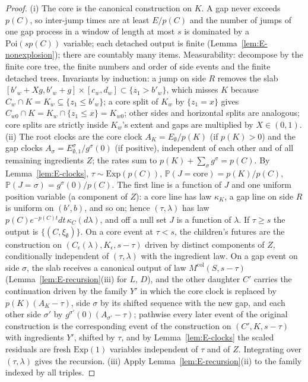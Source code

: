 \documentclass[11pt]{article}
\theoremstyle{plain}
\theoremstyle{definition}
\theoremstyle{remark}
\newcommand{\PP}{\mathbb{P}}
\newcommand{\Mcol}{M^{\mathrm{col}}}
\begin{document}
\begin{proof}
(i) The core is the canonical construction on $K$. A gap never exceeds $p(C)$, so
inter-jump times are at least $E/p(C)$ and the number of jumps of one gap process
in a window of length at most $s$ is dominated by a $\mathrm{Poi}(sp(C))$ variable; each
detached output is finite (Lemma~\ref{lem:E-nonexplosion}); there are countably many
items. Measurability: decompose by the finite core tree, the finite numbers and
order of side events and the finite detached trees. Invariants by induction: a
jump on side $R$ removes the slab $[b'_w+Xg,b'_w+g]\times[c_w,d_w]\subset\{z_1>b'_w\}$, which misses
$K$ because $C_w\cap K=K_w\subseteq\{z_1\le b'_w\}$; a core split of $K_w$ by $\{z_1=x\}$ gives
$C_{w0}\cap K=K_w\cap\{z_1\le x\}=K_{w0}$; other sides and horizontal splits are analogous; core
splits are strictly inside $K_w$'s extent and gaps are multiplied by $X\in(0,1)$.
(ii) The root clocks are the core clock $A_K=E_\emptyset/p(K)$ (if $p(K)>0$) and the gap
clocks $A_\sigma=E^{\sigma}_{\emptyset,1}/g^{\sigma}(0)$ (if positive), independent of each other and of
all remaining ingredients $Z$; the rates sum to $p(K)+\sum_\sigma g^{\sigma}=p(C)$. By
Lemma~\ref{lem:E-clocks}, $\tau\sim\mathrm{Exp}(p(C))$, $\PP(J=\mathrm{core})=p(K)/p(C)$, $\PP(J=\sigma)=g^{\sigma}(0)/p(C)$.
The first line is a function of $J$ and one uniform position variable (a component
of $Z$): a core line has law $\kappa_K$, a gap line on side $R$ is uniform on $(b',b)$, and so
on; hence $(\tau,\lambda)$ has law $p(C)e^{-p(C)t}dt\,\kappa_C(d\lambda)$, and off a null set $J$ is a
function of $\lambda$. If $\tau\ge s$ the output is $\{(C,\xi_\emptyset)\}$. On a core event at $\tau<s$, the
children's futures are the construction on $(C_\epsilon(\lambda),K_\epsilon,s-\tau)$ driven by distinct
components of $Z$, conditionally independent of $(\tau,\lambda)$ with the ingredient law. On
a gap event on side $\sigma$, the slab receives a canonical output of law
$\Mcol(S,s-\tau)$ (Lemma~\ref{lem:E-recursion}(iii) for $L$, $D$), and the other daughter
$C'$ carries the continuation driven by the family $Y'$ in which the core clock is
replaced by $p(K)(A_K-\tau)$, side $\sigma$ by its shifted sequence with the new gap, and
each other side $\sigma'$ by $g^{\sigma'}(0)(A_{\sigma'}-\tau)$; pathwise every later event of the original
construction is the corresponding event of the construction on $(C',K,s-\tau)$ with
ingredients $Y'$, shifted by $\tau$, and by Lemma~\ref{lem:E-clocks} the scaled residuals are
fresh $\mathrm{Exp}(1)$ variables independent of $\tau$ and of $Z$. Integrating over $(\tau,\lambda)$
gives the recursion. (iii) Apply Lemma~\ref{lem:E-recursion}(ii) to the family indexed
by all triples.
\end{proof}
\end{document}
